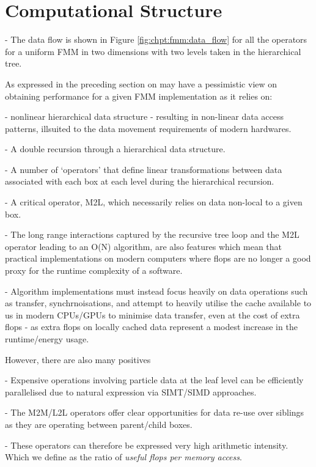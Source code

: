 \section{Computational Structure}\label{chpt:fmm:sec:computational_structure}

- The data flow is shown in Figure \ref{fig:chpt:fmm:data_flow} for all the operators for a uniform FMM in two dimensions with two levels taken in the hierarchical tree.

As expressed in the preceding section on may have a pessimistic view on obtaining performance for a given FMM implementation as it relies on:

- nonlinear hierarchical data structure - resulting in non-linear data access patterns, illsuited to the data movement requirements of modern hardwares.

- A double recursion through a hierarchical data structure.

- A number of `operators' that define linear transformations between data associated with each box at each level during the hierarchical recursion.

- A critical operator, M2L, which necessarily relies on data non-local to a given box.

- The long range interactions captured by the recursive tree loop and the M2L operator leading to an O(N) algorithm, are also features which mean that practical implementations on modern computers where flops are no longer a good proxy for the runtime complexity of a software.

- Algorithm implementations must instead focus heavily on data operations such as transfer, synchrnoisations, and attempt to heavily utilise the cache available to us in modern CPUs/GPUs to minimise data transfer, even at the cost of extra flops - as extra flops on locally cached data represent a modest increase in the runtime/energy usage.

However, there are also many positives

- Expensive operations involving particle data at the leaf level can be efficiently parallelised due to natural expression via SIMT/SIMD approaches.

- The M2M/L2L operators offer clear opportunities for data re-use over siblings as they are operating between parent/child boxes.

- These operators can therefore be expressed very high arithmetic intensity. Which we define as the ratio of \textit{useful flops per memory access}.

